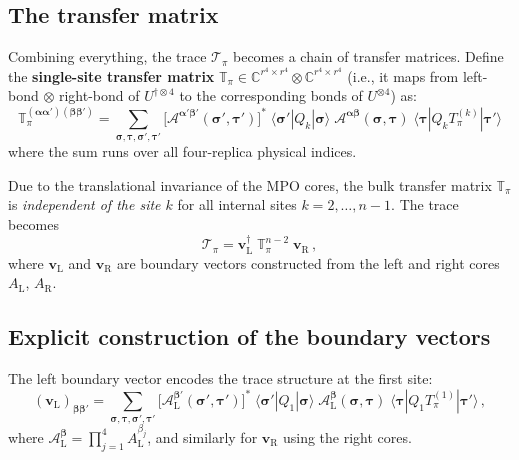 \documentclass[11pt,a4paper]{article}
\theoremstyle{definition}
\theoremstyle{remark}
\begin{document}
\subsection{The transfer matrix}

Combining everything, the trace $\mathcal{T}_\pi$ becomes a chain of transfer matrices.
Define the \textbf{single-site transfer matrix} $\mathbb{T}_\pi \in \mathbb{C}^{r^4\times r^4} \otimes \mathbb{C}^{r^4\times r^4}$ (i.e., it maps from left-bond $\otimes$ right-bond of $U^{\dagger\otimes 4}$ to the corresponding bonds of $U^{\otimes 4}$) as:
\begin{equation}\label{eq:transfer_def}
  \boxed{
  \mathbb{T}_\pi^{(\boldsymbol{\alpha}\boldsymbol{\alpha}')(\boldsymbol{\beta}\boldsymbol{\beta}')}
  = \sum_{\boldsymbol{\sigma},\boldsymbol{\tau},\boldsymbol{\sigma}',\boldsymbol{\tau}'}
  \bigl[\mathcal{A}^{\boldsymbol{\alpha}'\boldsymbol{\beta}'}(\boldsymbol{\sigma}',\boldsymbol{\tau}')\bigr]^*
  \; \langle\boldsymbol{\sigma}'|Q_k|\boldsymbol{\sigma}\rangle
  \; \mathcal{A}^{\boldsymbol{\alpha}\boldsymbol{\beta}}(\boldsymbol{\sigma},\boldsymbol{\tau})
  \; \langle\boldsymbol{\tau}|Q_k T_\pi^{(k)}|\boldsymbol{\tau}'\rangle
  }
\end{equation}
where the sum runs over all four-replica physical indices.

Due to the translational invariance of the MPO cores, the bulk transfer matrix $\mathbb{T}_\pi$ is \emph{independent of the site $k$} for all internal sites $k=2,\ldots,n-1$.  The trace becomes
\begin{equation}\label{eq:trace_transfer}
  \mathcal{T}_\pi = \mathbf{v}_{\mathrm{L}}^\dagger \;\mathbb{T}_\pi^{n-2}\; \mathbf{v}_{\mathrm{R}}\,,
\end{equation}
where $\mathbf{v}_{\mathrm{L}}$ and $\mathbf{v}_{\mathrm{R}}$ are boundary vectors constructed from the left and right cores $A_{\mathrm{L}}$, $A_{\mathrm{R}}$.

\subsection{Explicit construction of the boundary vectors}

The left boundary vector encodes the trace structure at the first site:
\begin{equation}\label{eq:vL}
  (\mathbf{v}_{\mathrm{L}})_{\boldsymbol{\beta}\boldsymbol{\beta}'}
  = \sum_{\boldsymbol{\sigma},\boldsymbol{\tau},\boldsymbol{\sigma}',\boldsymbol{\tau}'}
  \bigl[\mathcal{A}_{\mathrm{L}}^{\boldsymbol{\beta}'}(\boldsymbol{\sigma}',\boldsymbol{\tau}')\bigr]^*
  \;\langle\boldsymbol{\sigma}'|Q_1|\boldsymbol{\sigma}\rangle
  \;\mathcal{A}_{\mathrm{L}}^{\boldsymbol{\beta}}(\boldsymbol{\sigma},\boldsymbol{\tau})
  \;\langle\boldsymbol{\tau}|Q_1 T_\pi^{(1)}|\boldsymbol{\tau}'\rangle\,,
\end{equation}
where $\mathcal{A}_{\mathrm{L}}^{\boldsymbol{\beta}} = \prod_{j=1}^4 A_{\mathrm{L}}^{\beta_j}$,
and similarly for $\mathbf{v}_{\mathrm{R}}$ using the right cores.
\end{document}
